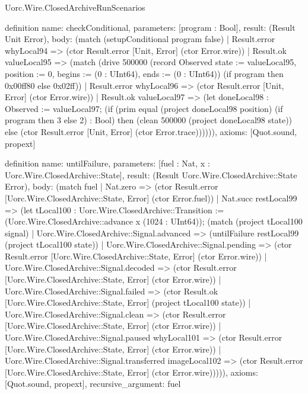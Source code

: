 \begin{lexlean}{Uorc.Wire.ClosedArchiveRunScenarios}
\begin{semanticmodule}
definition{
  name: checkConditional,
  parameters: [program : Bool],
  result: (Result Unit Error),
  body: (match (setupConditional program false)
    | Result.error whyLocal94 => (ctor Result.error [Unit, Error] (ctor Error.wire))
    | Result.ok valueLocal95 => (match (drive 500000 (record Observed {state := valueLocal95, position := 0, begins := (0 : UInt64), ends := (0 : UInt64)}) (if program then 0x00ff80 else 0x02ff))
      | Result.error whyLocal96 => (ctor Result.error [Unit, Error] (ctor Error.wire))
      | Result.ok valueLocal97 => (let doneLocal98 : Observed := valueLocal97; (if (prim equal (project doneLocal98 position) (if program then 3 else 2) : Bool) then (clean 500000 (project doneLocal98 state)) else (ctor Result.error [Unit, Error] (ctor Error.trace)))))),
  axioms: [Quot.sound, propext]
}

definition{
  name: untilFailure,
  parameters: [fuel : Nat, x : Uorc.Wire.ClosedArchive::State],
  result: (Result Uorc.Wire.ClosedArchive::State Error),
  body: (match fuel
    | Nat.zero => (ctor Result.error [Uorc.Wire.ClosedArchive::State, Error] (ctor Error.fuel))
    | Nat.succ restLocal99 => (let tLocal100 : Uorc.Wire.ClosedArchive::Transition := (Uorc.Wire.ClosedArchive::advance x (1024 : UInt64)); (match (project tLocal100 signal)
      | Uorc.Wire.ClosedArchive::Signal.advanced => (untilFailure restLocal99 (project tLocal100 state))
      | Uorc.Wire.ClosedArchive::Signal.pending => (ctor Result.error [Uorc.Wire.ClosedArchive::State, Error] (ctor Error.wire))
      | Uorc.Wire.ClosedArchive::Signal.decoded => (ctor Result.error [Uorc.Wire.ClosedArchive::State, Error] (ctor Error.wire))
      | Uorc.Wire.ClosedArchive::Signal.failed => (ctor Result.ok [Uorc.Wire.ClosedArchive::State, Error] (project tLocal100 state))
      | Uorc.Wire.ClosedArchive::Signal.clean => (ctor Result.error [Uorc.Wire.ClosedArchive::State, Error] (ctor Error.wire))
      | Uorc.Wire.ClosedArchive::Signal.paused whyLocal101 => (ctor Result.error [Uorc.Wire.ClosedArchive::State, Error] (ctor Error.wire))
      | Uorc.Wire.ClosedArchive::Signal.transferred imageLocal102 => (ctor Result.error [Uorc.Wire.ClosedArchive::State, Error] (ctor Error.wire))))),
  axioms: [Quot.sound, propext],
  recursive_argument: fuel
}


\end{semanticmodule}
\end{lexlean}
